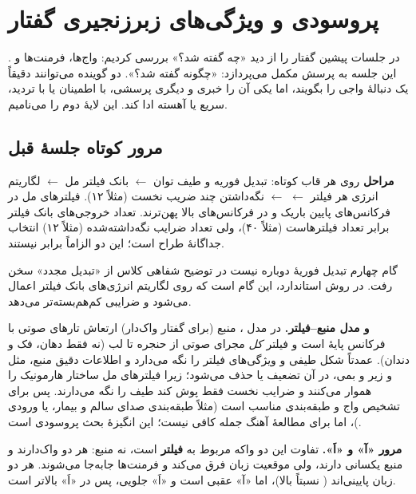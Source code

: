 \chapter{پروسودی و ویژگی‌های زبرزنجیری گفتار}

در جلسات پیشین گفتار را از دید «چه گفته شد؟» بررسی کردیم: واج‌ها، فرمنت‌ها و . این جلسه به پرسش مکمل می‌پردازد: «چگونه گفته شد؟». دو گوینده می‌توانند دقیقاً یک دنبالهٔ واجی را بگویند، اما یکی آن را خبری و دیگری پرسشی، با اطمینان یا با تردید، سریع یا آهسته ادا کند. این لایهٔ دوم را  می‌نامیم.

\section{مرور کوتاه جلسهٔ قبل}

\textbf{مراحل } روی هر قاب کوتاه: تبدیل فوریه و طیف توان $\leftarrow$ بانک فیلتر مل $\leftarrow$ لگاریتم انرژی هر فیلتر $\leftarrow$  $\leftarrow$ نگه‌داشتن چند ضریب نخست (مثلاً ۱۲). فیلترهای مل در فرکانس‌های پایین باریک و در فرکانس‌های بالا پهن‌ترند. تعداد خروجی‌های بانک فیلتر برابر تعداد فیلترهاست (مثلاً ۴۰)، ولی تعداد ضرایب نگه‌داشته‌شده (مثلاً ۱۲) انتخاب جداگانهٔ طراح است؛ این دو الزاماً برابر نیستند.

\begin{correctionbox}{گام چهارم  تبدیل فوریهٔ دوباره نیست}
در توضیح شفاهی کلاس از «تبدیل مجدد» سخن رفت. در روش استاندارد، این گام  است که روی لگاریتم انرژی‌های بانک فیلتر اعمال می‌شود و ضرایبی کم‌هم‌بسته‌تر می‌دهد.
\end{correctionbox}

\textbf{ و مدل منبع–فیلتر.} در مدل ، منبع (برای گفتار واک‌دار) ارتعاش تارهای صوتی با فرکانس پایهٔ  است و فیلتر \emph{کل} مجرای صوتی از حنجره تا لب (نه فقط دهان، فک و دندان).  عمدتاً شکل طیفی و ویژگی‌های فیلتر را نگه می‌دارد و اطلاعات دقیق منبع، مثل  و زیر و بمی، در آن تضعیف یا حذف می‌شود؛ زیرا فیلترهای مل ساختار هارمونیک را هموار می‌کنند و ضرایب نخست فقط پوش کند طیف را نگه می‌دارند. پس  برای تشخیص واج و طبقه‌بندی مناسب است (مثلاً طبقه‌بندی صدای سالم و بیمار، یا ورودی )، اما برای مطالعهٔ آهنگ جمله کافی نیست؛ این انگیزهٔ بحث پروسودی است.

\textbf{مرور «آ» و «اَ».} تفاوت این دو واکه مربوط به \textbf{فیلتر} است، نه منبع: هر دو واک‌دارند و منبع یکسانی دارند، ولی موقعیت زبان فرق می‌کند و فرمنت‌ها جابه‌جا می‌شوند. هر دو زبان پایینی‌اند ( نسبتاً بالا)، اما «آ» عقبی است و «اَ» جلویی، پس  در «اَ» بالاتر است.

